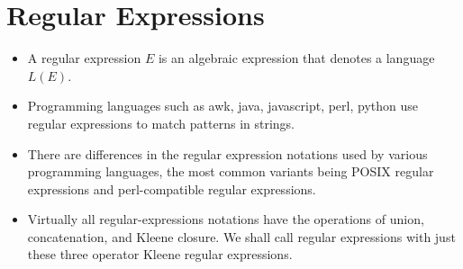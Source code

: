 \documentclass[]{article}
\begin{document}
\section{Regular Expressions}
  \begin{itemize}
    \item A regular expression $E$ is an algebraic expression that denotes a
          language $L(E)$.
    \item Programming languages such as awk, java, javascript, perl, python use
          regular expressions to match patterns in strings.
    \item There are differences in the regular expression notations used by
          various programming languages, the most common variants being POSIX
          regular expressions and perl-compatible regular expressions.
    \item Virtually all regular-expressions notations have the operations of
          union, concatenation, and Kleene closure. We shall call regular
          expressions with just these three operator Kleene regular expressions.
  \end{itemize}
\end{document}
